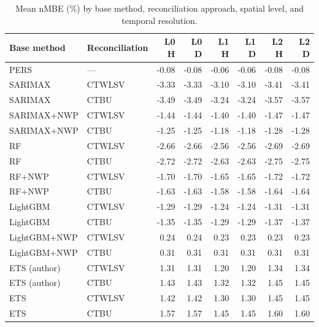 \begin{table}[htbp]
\centering
\small
\caption{Mean nMBE (\%) by base method, reconciliation approach, spatial level, and temporal resolution.}
\label{tab:nmbe}
\begin{tabular}{llrrrrrr}
\toprule
Base method & Reconciliation & L0 H & L0 D & L1 H & L1 D & L2 H & L2 D \\
\midrule
PERS & --- & -0.08 & -0.08 & -0.06 & -0.06 & -0.08 & -0.08 \\
\addlinespace
SARIMAX & CTWLSV & -3.33 & -3.33 & -3.10 & -3.10 & -3.41 & -3.41 \\
SARIMAX & CTBU & -3.49 & -3.49 & -3.24 & -3.24 & -3.57 & -3.57 \\
SARIMAX+NWP & CTWLSV & -1.44 & -1.44 & -1.40 & -1.40 & -1.47 & -1.47 \\
SARIMAX+NWP & CTBU & -1.25 & -1.25 & -1.18 & -1.18 & -1.28 & -1.28 \\
\addlinespace
RF & CTWLSV & -2.66 & -2.66 & -2.56 & -2.56 & -2.69 & -2.69 \\
RF & CTBU & -2.72 & -2.72 & -2.63 & -2.63 & -2.75 & -2.75 \\
RF+NWP & CTWLSV & -1.70 & -1.70 & -1.65 & -1.65 & -1.72 & -1.72 \\
RF+NWP & CTBU & -1.63 & -1.63 & -1.58 & -1.58 & -1.64 & -1.64 \\
\addlinespace
LightGBM & CTWLSV & -1.29 & -1.29 & -1.24 & -1.24 & -1.31 & -1.31 \\
LightGBM & CTBU & -1.35 & -1.35 & -1.29 & -1.29 & -1.37 & -1.37 \\
LightGBM+NWP & CTWLSV & 0.24 & 0.24 & 0.23 & 0.23 & 0.23 & 0.23 \\
LightGBM+NWP & CTBU & 0.31 & 0.31 & 0.31 & 0.31 & 0.31 & 0.31 \\
\addlinespace
ETS (author) & CTWLSV & 1.31 & 1.31 & 1.20 & 1.20 & 1.34 & 1.34 \\
ETS (author) & CTBU & 1.43 & 1.43 & 1.32 & 1.32 & 1.45 & 1.45 \\
ETS & CTWLSV & 1.42 & 1.42 & 1.30 & 1.30 & 1.45 & 1.45 \\
ETS & CTBU & 1.57 & 1.57 & 1.45 & 1.45 & 1.60 & 1.60 \\
\bottomrule
\end{tabular}
\end{table}

